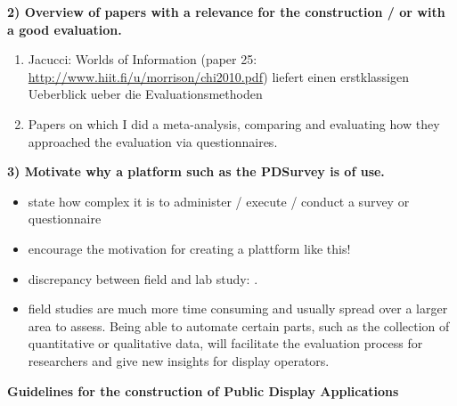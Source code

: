 	\textbf{2) Overview of papers with a relevance for the construction / or with a good evaluation.}

		\begin{enumerate}
		\item Jacucci: Worlds of Information (paper 25: \url{http://www.hiit.fi/u/morrison/chi2010.pdf}) liefert einen erstklassigen Ueberblick ueber die Evaluationsmethoden
		\item Papers on which I did a meta-analysis, comparing and evaluating how they approached the evaluation via questionnaires.
	\end{enumerate}




	\textbf{3) Motivate why a platform such as the PDSurvey is of use. }

		\begin{itemize}[itemsep=0pt] 
		\item state how complex it is to administer / execute / conduct a survey or questionnaire
		\item encourage the motivation for creating a plattform like this!
		\item discrepancy between field and lab study: \cite{Ojala2011}.
		\item field studies are much more time consuming and usually spread over a larger area to assess. Being able to automate certain parts, such as the collection of quantitative or qualitative data, will facilitate the evaluation process for researchers and give new insights for display operators.
		\end{itemize}




	\textbf{Guidelines for the construction of Public Display Applications}

